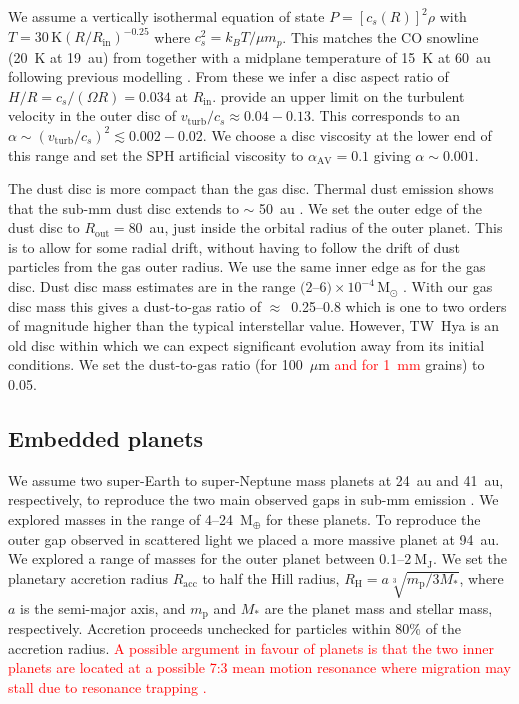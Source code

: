 \documentclass[usenatbib,a4paper,times]{mnras}
\renewcommand{\sun}{\mathrm{M}_{\odot}}
\renewcommand{\earth}{\mathrm{M}_{\oplus}}
\newcommand{\new}[1]{{\textcolor{red}{#1}}}
\begin{document}
We assume a vertically isothermal equation of state $P={[c_s(R)]}^2\rho$ with $T
= 30\,\mathrm{K} {(R/R_{\mathrm{in}})}^{-0.25}$ where $c_s^2={k_B}T/\mu m_p$.
This matches the CO snowline (20~K at 19~au) from \citet{vant-hoff:2017}
together with a midplane temperature of 15~K at 60~au following previous
modelling \citep{andrews:2012}. From these we infer a disc aspect ratio of $H/R
= c_s/(\Omega R) = 0.034$ at $R_{\mathrm{in}}$. \citet{flaherty:2018} provide
an upper limit on the turbulent velocity in the outer disc of
$v_{\mathrm{turb}}/c_s\approx 0.04-0.13$. This corresponds to an $\alpha \sim
{(v_{\mathrm{turb}}/c_s)}^2 \lesssim 0.002-0.02$. We choose a disc viscosity
\citep{shakura:1973} at the lower end of this range and set the SPH artificial
viscosity to $\alpha_{\mathrm{AV}} = 0.1$ giving $\alpha \sim 0.001$.

The dust disc is more compact than the gas disc. Thermal dust emission shows
that the sub-mm dust disc extends to $\sim$ 50~au \citep{andrews:2016}. We set
the outer edge of the dust disc to $R_{\mathrm{out}}=80$~au, just inside the
orbital radius of the outer planet. This is to allow for some radial drift,
without having to follow the drift of dust particles from the gas outer radius.
We use the same inner edge as for the gas disc. Dust disc mass estimates are in
the range $(2$--$6)\times 10^{-4}\,\sun{}$ \citep{calvet:2002, thi:2010}. With
our gas disc mass this gives a dust-to-gas ratio of $\approx$~0.25--0.8 which is
one to two orders of magnitude higher than the typical interstellar value.
However, TW~Hya is an old disc within which we can expect significant evolution
away from its initial conditions. We set the dust-to-gas ratio (for 100~$\mu$m
\new{and for 1~mm} grains) to 0.05.





\subsection{Embedded planets}

We assume two super-Earth to super-Neptune mass planets at 24~au and 41~au,
respectively, to reproduce the two main observed gaps in sub-mm emission
\citep{andrews:2016}. We explored masses in the range of 4--24~$\earth{}$ for
these planets. To reproduce the outer gap observed in scattered light
\citep{van-boekel:2017} we placed a more massive planet at 94~au. We explored a
range of masses for the outer planet between 0.1--$2~\mathrm{M_J}$. We set the
planetary accretion radius $R_{\mathrm{acc}}$ to half the Hill radius,
$R_{\mathrm{H}} = a\sqrt[3]{m_{\mathrm{p}}/3M_*}$, where $a$ is the semi-major
axis, and $m_{\mathrm{p}}$ and $M_*$ are the planet mass and stellar mass,
respectively. Accretion proceeds unchecked for particles within 80\% of the
accretion radius. \new{A possible argument in favour of planets is that the two
inner planets are located at a possible 7:3 mean motion resonance where
migration may stall due to resonance trapping \citep{terquem:2007}.}
\end{document}
